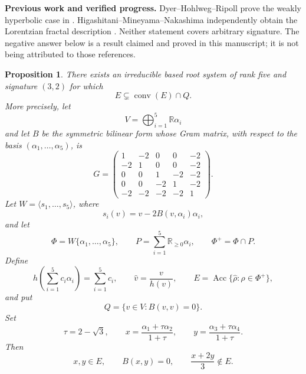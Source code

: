 \documentclass[11pt,reqno]{amsart}
\theoremstyle{plain}
\newtheorem{proposition}[theorem]{Proposition}
\theoremstyle{definition}
\theoremstyle{remark}
\numberwithin{equation}{section}
\begin{document}
\par\medskip
\noindent\textbf{Previous work and verified progress.}
Dyer--Hohlweg--Ripoll prove the weakly hyperbolic case in
\cite[Theorem~4.10]{DHR}. Higashitani--Mineyama--Nakashima independently
obtain the Lorentzian fractal description \cite[Theorem~1.2]{HMN2019}.
Neither statement covers arbitrary signature. The negative answer below
is a result claimed and proved in this manuscript; it is not being
attributed to those references.

\begin{proposition}\label{prop:counterexample-convE-Q}
There exists an irreducible based root system of rank five and
signature $(3,2)$ for which
\[
E \subsetneq \operatorname{conv}(E)\cap Q.
\]
More precisely, let
\[
V=\bigoplus_{i=1}^{5}\mathbb{R}\alpha_i
\]
and let $B$ be the symmetric bilinear form whose Gram matrix,
with respect to the basis $(\alpha_1,\ldots,\alpha_5)$, is
\[
G=
\begin{pmatrix}
1&-2&0&0&-2\\
-2&1&0&0&-2\\
0&0&1&-2&-2\\
0&0&-2&1&-2\\
-2&-2&-2&-2&1
\end{pmatrix}.
\]
Let $W=\langle s_1,\ldots,s_5\rangle$, where
\[
s_i(v)=v-2B(v,\alpha_i)\alpha_i,
\]
and let
\[
\Phi=W\{\alpha_1,\ldots,\alpha_5\},
\qquad
P=\sum_{i=1}^{5}\mathbb{R}_{\geq 0}\alpha_i,
\qquad
\Phi^+=\Phi\cap P.
\]
Define
\[
h\left(\sum_{i=1}^{5}c_i\alpha_i\right)=\sum_{i=1}^{5}c_i,
\qquad
\widehat{v}=\frac{v}{h(v)},
\qquad
E=\operatorname{Acc}\{\widehat{\rho}:\rho\in\Phi^+\},
\]
and put
\[
Q=\{v\in V:B(v,v)=0\}.
\]
Set
\[
\tau=2-\sqrt{3},
\qquad
x=\frac{\alpha_1+\tau\alpha_2}{1+\tau},
\qquad
y=\frac{\alpha_3+\tau\alpha_4}{1+\tau}.
\]
Then
\[
x,y\in E,
\qquad
B(x,y)=0,
\qquad
\frac{x+2y}{3}\notin E.
\]
\end{proposition}
\end{document}
